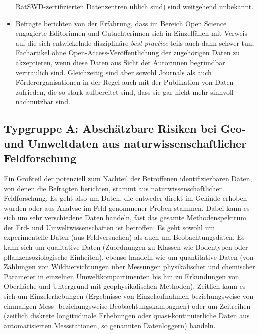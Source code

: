 \documentclass[a4paper,
fontsize=11pt,
oneside,
numbers=noperiodatend,
parskip=half-,
bibliography=totoc,
final
]{scrartcl}
\begin{document}
\begin{itemize}
  RatSWD-zertifizierten Datenzentren üblich sind) sind weitgehend
  unbekannt.
\item
  Befragte berichten von der Erfahrung, dass im Bereich Open Science
  engagierte Editorinnen und Gutachterinnen sich in Einzelfällen mit
  Verweis auf die sich entwickelnde disziplinäre \emph{best practice}
  teils auch dann schwer tun, Fachartikel ohne
  Open-Access-Veröffentlich\-ung der zugehörigen Daten zu akzeptieren,
  wenn diese Daten aus Sicht der Autorinnen begründbar vertraulich sind.
  Gleichzeitig sind aber sowohl Journals als auch Förderorganisationen
  in der Regel auch mit der Publikation von Daten zufrieden, die so
  stark aufbereitet sind, dass sie gar nicht mehr sinnvoll nachnutzbar
  sind.
\end{itemize}

\hypertarget{typgruppe-a-abschuxe4tzbare-risiken-bei-geo--und-umweltdaten-aus-naturwissenschaftlicher-feldforschung}{%
\subsection{Typgruppe A: Abschätzbare Risiken bei Geo- und Umweltdaten aus naturwissenschaftlicher Feldforschung}\label{typgruppe-a-abschuxe4tzbare-risiken-bei-geo--und-umweltdaten-aus-naturwissenschaftlicher-feldforschung}}

Ein Großteil der potenziell zum Nachteil der Betroffenen
identifizierbaren Daten, von denen die Befragten berichten, stammt aus
naturwissenschaftlicher Feldforschung. Es geht also um Daten, die
entweder direkt im Gelände erhoben wurden oder aus Analyse im Feld
genommener Proben stammen. Dabei kann es sich um sehr verschiedene Daten
handeln, fast das gesamte Methodenspektrum der Erd- und
Umweltwissenschaften ist betroffen: Es geht sowohl um experimentelle
Daten (aus Feldversuchen) als auch um Beobachtungsdaten. Es kann sich um
qualitative Daten (Zuordnungen zu Klassen wie Bodentypen oder
pflanzensoziologische Einheiten), ebenso handeln wie um quantitative
Daten (von Zählungen von Wildtiersichtungen über Messungen
physikalischer und chemischer Parameter in einzelnen
Umweltkompartimenten bis hin zu Erkundungen von Oberfläche und
Untergrund mit geophysikalischen Methoden). Zeitlich kann es sich um
Einzelerhebungen (Ergebnisse von Einzelaufnahmen beziehungsweise von
einmaligen Mess- beziehungsweise Beobachtungskampagnen) oder um
Zeitreihen (zeitlich diskrete longitudinale Erhebungen oder
quasi-kontinuierliche Daten aus automatisierten Messstationen, so
genannten Datenloggern) handeln.
\end{document}
